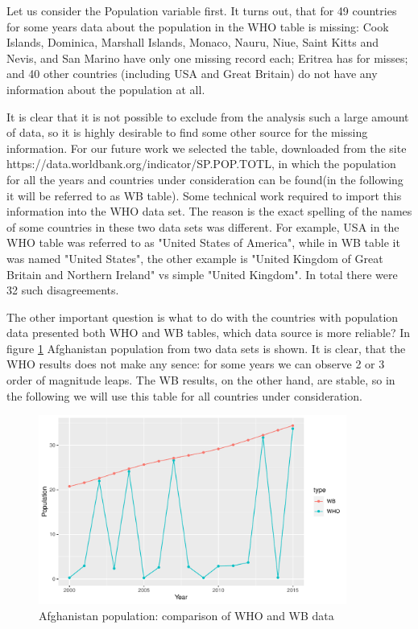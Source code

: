 Let us consider the Population variable first. It turns out, that for 49 countries for some years data about the population in the WHO table is missing: Cook Islands, Dominica, Marshall Islands, Monaco, Nauru, Niue, Saint Kitts and Nevis, and San Marino have only one missing record each; Eritrea has for misses; and 40 other countries (including USA and Great Britain) do not have any information about the population at all.

It is clear that it is not possible to exclude from the analysis such a large amount of data, so it is highly desirable to find some other source for the missing information. For our future work we selected the table, downloaded from the site https://data.worldbank.org/indicator/SP.POP.TOTL, in which the population for all the years and countries under consideration can be found(in the following it will be referred to as WB table). Some technical work required to import this information into the WHO data set. The reason is the exact spelling of the names of some countries in these two data sets was different. For example, USA in the WHO table was referred to as "United States of America", while in WB table it was named "United States", the other example is "United Kingdom of Great Britain and Northern Ireland" vs simple "United Kingdom".  In total there were 32 such disagreements.

The other important question is what to do with the countries with population data presented both WHO and WB tables, which data source is more reliable? In figure \ref{fig:afghanistan_pop_comparison} Afghanistan population from two data sets is shown. It is clear, that the WHO results does not make any sence: for some years we can observe 2 or 3 order of magnitude leaps. The WB results, on the other hand, are stable, so in the following we will use this table for all countries under consideration.


\begin{figure}
  \centering
  \includegraphics[width = 0.9\textwidth]{figures/Afghanistan_population_comparison}
  \caption{Afghanistan population: comparison of WHO and WB data}
  \label{fig:afghanistan_pop_comparison}
\end{figure}

